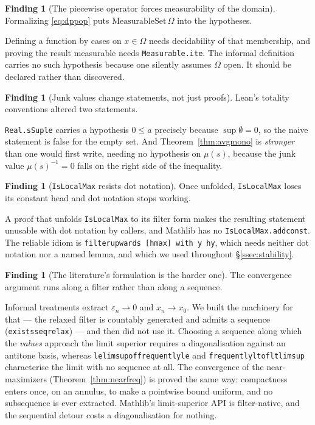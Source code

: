 \documentclass[11pt,reqno]{amsart}
\newcommand{\LEANREF}[1]{\texttt{\small\def\_{\textunderscore\allowbreak}#1}}
\newcommand{\eps}{\varepsilon}
\theoremstyle{plain}
\theoremstyle{definition}
\newtheorem{finding}[theorem]{Finding}
\begin{document}
\begin{finding}[The piecewise operator forces measurability of the
domain]\label{find:measdom}
Formalizing \eqref{eq:dppop} puts $\mathrm{MeasurableSet}\,\Omega$ into the
hypotheses.
\end{finding}

Defining a function by cases on $x \in \Omega$ needs decidability of that
membership, and proving the result measurable needs
\LEANREF{Measurable.ite}. The informal definition carries no such hypothesis
because one silently assumes $\Omega$ open. It should be declared rather than
discovered.

\begin{finding}[Junk values change statements, not just
proofs]\label{find:junk}
Lean's totality conventions altered two statements.
\end{finding}

\LEANREF{Real.sSup\_le} carries a hypothesis $0 \le a$ precisely because
$\sup\emptyset = 0$, so the naive statement is false for the empty set. And
Theorem~\ref{thm:avgmono} is \emph{stronger} than one would first write,
needing no hypothesis on $\mu(s)$, because the junk value
$\mu(s)^{-1} = 0$ falls on the right side of the inequality.

\begin{finding}[\LEANREF{IsLocalMax} resists dot
notation]\label{find:localmax}
Once unfolded, \LEANREF{IsLocalMax} loses its constant head and dot notation
stops working.
\end{finding}

A proof that unfolds \LEANREF{IsLocalMax} to its filter form makes the
resulting statement unusable with dot notation by callers, and Mathlib has no
\LEANREF{IsLocalMax.add\_const}. The reliable idiom is
\LEANREF{filter\_upwards [hmax] with y hy}, which needs neither dot notation
nor a named lemma, and which we used throughout \S\ref{ssec:stability}.

\begin{finding}[The literature's formulation is the harder
one]\label{find:filter2}
The convergence argument runs along a filter rather than along a sequence.
\end{finding}

Informal treatments extract $\eps_n \to 0$ and $x_n \to x_0$. We built the
machinery for that --- the relaxed filter is countably generated and admits a
sequence (\LEANREF{exists\_seq\_relax}) --- and then did not use it. Choosing a
sequence along which the \emph{values} approach the limit superior requires a
diagonalisation against an antitone basis, whereas
\LEANREF{le\_limsup\_of\_frequently\_le} and
\LEANREF{frequently\_lt\_of\_lt\_limsup} characterise the limit with no sequence
at all. The convergence of the near-maximizers (Theorem~\ref{thm:nearfreq}) is
proved the same way: compactness enters once, on an annulus, to make a
pointwise bound uniform, and no subsequence is ever extracted. Mathlib's
limit-superior API is filter-native, and the sequential detour costs a
diagonalisation for nothing.
\end{document}

